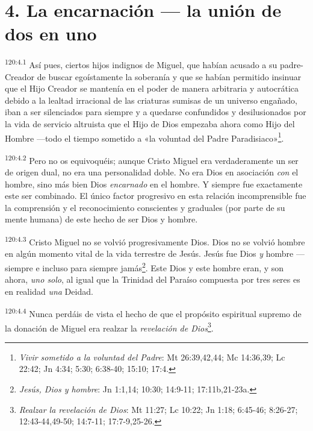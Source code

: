 \section*{4. La encarnación --- la unión de dos en uno}
\par
\textsuperscript{120:4.1} Así pues, ciertos hijos indignos de Miguel, que habían acusado a su padre-Creador de buscar egoístamente la soberanía y que se habían permitido insinuar que el Hijo Creador se mantenía en el poder de manera arbitraria y autocrática debido a la lealtad irracional de las criaturas sumisas de un universo engañado, iban a ser silenciados para siempre y a quedarse confundidos y desilusionados por la vida de servicio altruista que el Hijo de Dios empezaba ahora como Hijo del Hombre ---todo el tiempo sometido a «la voluntad del Padre Paradisiaco»\footnote{\textit{Vivir sometido a la voluntad del Padre}: Mt 26:39,42,44; Mc 14:36,39; Lc 22:42; Jn 4:34; 5:30; 6:38-40; 15:10; 17:4.}.

\par
\textsuperscript{120:4.2} Pero no os equivoquéis; aunque Cristo Miguel era verdaderamente un ser de origen dual, no era una personalidad doble. No era Dios en asociación \textit{con} el hombre, sino más bien Dios \textit{encarnado} en el hombre. Y siempre fue exactamente este ser combinado. El único factor progresivo en esta relación incomprensible fue la comprensión y el reconocimiento conscientes y graduales (por parte de su mente humana) de este hecho de ser Dios y hombre.

\par
\textsuperscript{120:4.3} Cristo Miguel no se volvió progresivamente Dios. Dios no se volvió hombre en algún momento vital de la vida terrestre de Jesús. Jesús fue Dios \textit{y} hombre ---siempre e incluso para siempre jamás\footnote{\textit{Jesús, Dios y hombre}: Jn 1:1,14; 10:30; 14:9-11; 17:11b,21-23a.}. Este Dios y este hombre eran, y son ahora, \textit{uno solo}, al igual que la Trinidad del Paraíso compuesta por tres seres es en realidad \textit{una} Deidad.

\par
\textsuperscript{120:4.4} Nunca perdáis de vista el hecho de que el propósito espiritual supremo de la donación de Miguel era realzar la \textit{revelación de Dios}\footnote{\textit{Realzar la revelación de Dios}: Mt 11:27; Lc 10:22; Jn 1:18; 6:45-46; 8:26-27; 12:43-44,49-50; 14:7-11; 17:7-9,25-26.}.

